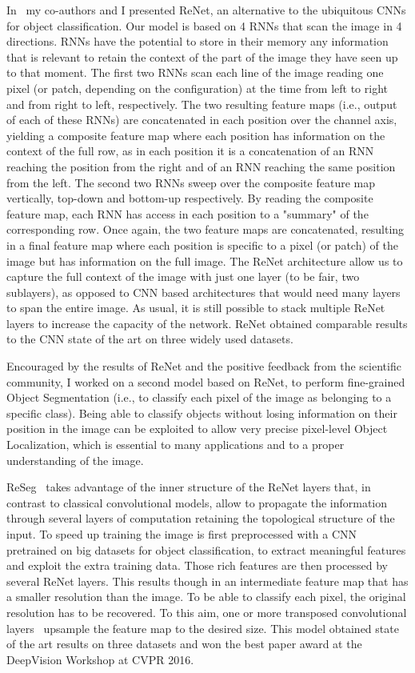In~\cite{visin2015renet} my co-authors and I presented ReNet, an alternative to
the ubiquitous CNNs for object classification. Our model is based on 4 RNNs
that scan the image in 4 directions. RNNs have the potential to store in their
memory any information that is relevant to retain the context of the part of
the image they have seen up to that moment. The first two RNNs scan each line
of the image reading one pixel (or patch, depending on the configuration) at
the time from left to right and from right to left, respectively. The two
resulting feature maps (i.e., output of each of these RNNs) are concatenated in
each position over the channel axis, yielding a composite feature map where
each position has information on the context of the full row, as in each
position it is a concatenation of an RNN reaching the position from the right
and of an RNN reaching the same position from the left. The second two RNNs
sweep over the composite feature map vertically, top-down and bottom-up
respectively. By reading the composite feature map, each RNN has access in each
position to a "summary" of the corresponding row. Once again, the two feature
maps are concatenated, resulting in a final feature map where each position is
specific to a pixel (or patch) of the image but has information on the full
image. The ReNet architecture allow us to capture the full context of the image
with just one layer (to be fair, two sublayers), as opposed to CNN based
architectures that would need many layers to span the entire image. As usual,
it is still possible to stack multiple ReNet layers to increase the capacity of
the network. ReNet obtained comparable results to the CNN state of the art on
three widely used datasets.

Encouraged by the results of ReNet and the positive feedback from the
scientific community, I worked on a second model based on ReNet, to perform
fine-grained Object Segmentation (i.e., to classify each pixel of the image as
belonging to a specific class). Being able to classify objects without losing
information on their position in the image can be exploited to allow very
precise pixel-level Object Localization, which is essential to many
applications and to a proper understanding of the image.

ReSeg~\citep{visin15} takes advantage of the inner structure of the ReNet
layers that, in contrast to classical convolutional models, allow to propagate
the information through several layers of computation retaining the topological
structure of the input. To speed up training the image is first preprocessed
with a CNN pretrained on big datasets for object classification, to extract
meaningful features and exploit the extra training data. Those rich features
are then processed by several ReNet layers. This results though in an
intermediate feature map that has a smaller resolution than the image. To be
able to classify each pixel, the original resolution has to be recovered. To
this aim, one or more transposed convolutional layers~\citep{dumoulin2016guide}
upsample the feature map to the desired size. This model obtained state of the
art results on three datasets and won the best paper award at the DeepVision
Workshop at CVPR 2016.

